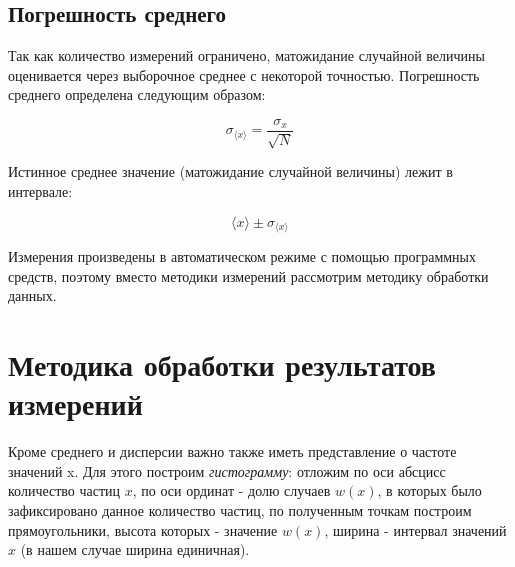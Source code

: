 \documentclass{report}
\begin{document}
	\begin{table}[h]
		\centering
	\end{table}
	
	\subsection*{Погрешность среднего}
	
	\hspace{4mm} Так как количество измерений ограничено, матожидание случайной величины оценивается через выборочное среднее с некоторой точностью. Погрешность среднего определена следующим образом:
	
	\begin{equation}
		\sigma_{\langle x \rangle} = \frac{\sigma_{x}}{\sqrt{N}}
	\end{equation}
	
	Истинное среднее значение (матожидание случайной величины) лежит в интервале:
	
	\begin{equation}
		\langle x \rangle \pm \sigma_{\langle x \rangle}
	\end{equation}
	
	Измерения произведены в автоматическом режиме с помощью программных средств, поэтому вместо методики измерений рассмотрим методику обработки данных.
	
	\section*{Методика обработки результатов измерений}
	
	\hspace{4mm} Кроме среднего и дисперсии важно также иметь представление о частоте значений x. Для этого построим \textit{гистограмму}: отложим по оси абсцисс количество частиц $x$, по оси ординат - долю случаев $w(x)$, в которых было зафиксировано данное количество частиц, по полученным точкам построим прямоугольники, высота которых - значение $w(x)$, ширина - интервал значений $x$ (в нашем случае ширина единичная). 
	
\end{document}
